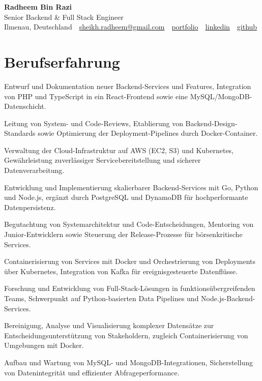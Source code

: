 \documentclass[11pt,a4paper]{resume}
\makeatletter
\newcommand{\Portfolio}{https://radheem.github.io/my-cv}
\newcommand{\PortfolioText}{portfolio}
\newcommand{\GitHub}{https://github.com/radheem}
\newcommand{\LinkedIn}{https://www.linkedin.com/in/radheem-razi}
\newcommand{\Email}{sheikh.radheem@gmail.com}
\makeatother
\begin{document}
\clearpage
{}

\begin{center}
  {\huge\bfseries Radheem Bin Razi}\\[3pt]
  {\large Senior Backend \& Full Stack Engineer}\\[6pt]
  \small
  Ilmenau, Deutschland \,\textbar\,
  \href{mailto:\Email}{\Email} \,\textbar\,
  \href{\Portfolio}{\PortfolioText} \,\textbar\,
  \href{\LinkedIn}{linkedin} \,\textbar\,
  \href{\GitHub}{github}
\end{center}
\vspace{2pt}

\section{Berufserfahrung}

\bullets
  \item Entwurf und Dokumentation neuer Backend-Services und Features, Integration von PHP und TypeScript in ein React-Frontend sowie eine MySQL/MongoDB-Datenschicht.
  \item Leitung von System- und Code-Reviews, Etablierung von Backend-Design-Standards sowie Optimierung der Deployment-Pipelines durch Docker-Container.
  \item Verwaltung der Cloud-Infrastruktur auf AWS (EC2, S3) und Kubernetes, Gewährleistung zuverlässiger Servicebereitstellung und sicherer Datenverarbeitung.
\bulletsend
\vspace{3pt}
\bullets
  \item Entwicklung und Implementierung skalierbarer Backend-Services mit Go, Python und Node.js, ergänzt durch PostgreSQL und DynamoDB für hochperformante Datenpersistenz.
  \item Begutachtung von Systemarchitektur und Code-Entscheidungen, Mentoring von Junior-Entwicklern sowie Steuerung der Release-Prozesse für börsenkritische Services.
  \item Containerisierung von Services mit Docker und Orchestrierung von Deployments über Kubernetes, Integration von Kafka für ereignisgesteuerte Datenflüsse.
\bulletsend
\vspace{3pt}
\bullets
  \item Forschung und Entwicklung von Full-Stack-Lösungen in funktionsübergreifenden Teams, Schwerpunkt auf Python-basierten Data Pipelines und Node.js-Backend-Services.
  \item Bereinigung, Analyse und Visualisierung komplexer Datensätze zur Entscheidungsunterstützung von Stakeholdern, zugleich Containerisierung von Umgebungen mit Docker.
  \item Aufbau und Wartung von MySQL- und MongoDB-Integrationen, Sicherstellung von Datenintegrität und effizienter Abfrageperformance.
\bulletsend
\vspace{3pt}
\end{document}
